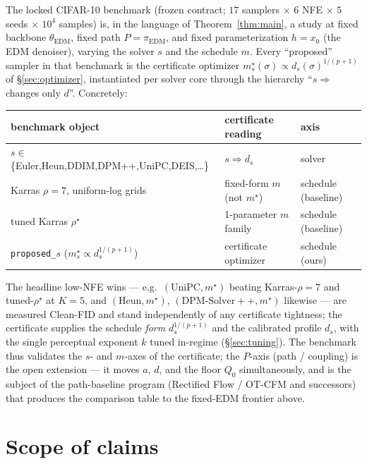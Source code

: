 \documentclass[11pt]{article}
\begin{document}
The locked CIFAR-10 benchmark (frozen contract; $17$ samplers $\times$ $6$
NFE $\times$ $5$ seeds $\times$ $10^4$ samples) is, in the language of
Theorem~\ref{thm:main}, a study at fixed backbone $\theta_{\mathrm{EDM}}$,
fixed path $P=\pi_{\mathrm{EDM}}$, and fixed parameterization
$h=x_0$ (the EDM denoiser), varying the solver $s$ and the schedule $m$.
Every ``proposed'' sampler in that benchmark is the certificate optimizer
$m^\star_s(\sigma)\propto d_s(\sigma)^{1/(p+1)}$ of \S\ref{sec:optimizer},
instantiated per solver core through the hierarchy ``$s\Rightarrow$
changes only $d$''. Concretely:

\begin{center}
\small
\begin{tabular}{l l l}
\toprule
benchmark object & certificate reading & axis \\
\midrule
$s\in$\{Euler,Heun,DDIM,DPM++,UniPC,DEIS,\dots\} & $s\Rightarrow d_s$ & solver \\
Karras $\rho{=}7$, uniform-log grids & fixed-form $m$ (not $m^\star$) & schedule (baseline) \\
tuned Karras $\rho^\star$ & 1-parameter $m$ family & schedule (baseline) \\
\texttt{proposed\_$s$} ($m^\star_s\propto d_s^{1/(p+1)}$) & certificate optimizer & schedule (ours) \\
\bottomrule
\end{tabular}
\end{center}

\noindent
The headline low-NFE wins --- e.g.\ $(\mathrm{UniPC},m^\star)$ beating
Karras-$\rho{=}7$ and tuned-$\rho^\star$ at $K{=}5$, and
$(\mathrm{Heun},m^\star)$, $(\mathrm{DPM\text{-}Solver}{+}{+},m^\star)$
likewise --- are measured Clean-FID and stand independently of any
certificate tightness; the certificate supplies the schedule \emph{form}
$d_s^{1/(p+1)}$ and the calibrated profile $d_s$, with the single perceptual
exponent $k$ tuned in-regime (\S\ref{sec:tuning}). The benchmark thus
validates the $s$- and $m$-axes of the certificate; the $P$-axis (path /
coupling) is the open extension --- it moves $a$, $d$, and the floor
$Q_0$ simultaneously, and is the subject of the path-baseline program
(Rectified Flow / OT-CFM and successors) that produces the comparison
table to the fixed-EDM frontier above.

\section{Scope of claims}
\label{sec:scope}
\end{document}
